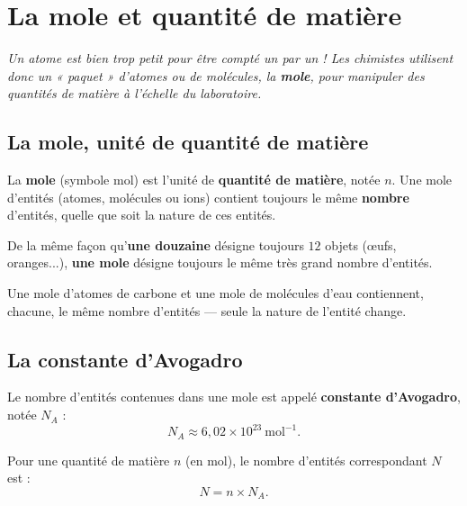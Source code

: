 \chapter{La mole et quantité de matière}

\noindent\textit{Un atome est bien trop petit pour être compté un par un ! Les chimistes
utilisent donc un « paquet » d'atomes ou de molécules, la \textbf{mole}, pour manipuler
des quantités de matière à l'échelle du laboratoire.}
\vspace{8pt}

\connecteBanner

\section{La mole, unité de quantité de matière}

\begin{definition}[Mole]
La \textbf{mole} (symbole $\mathrm{mol}$) est l'unité de \textbf{quantité de matière},
notée $n$. Une mole d'entités (atomes, molécules ou ions) contient toujours le même
\textbf{nombre} d'entités, quelle que soit la nature de ces entités.
\end{definition}

\begin{propriete}[Analogie]
De la même façon qu'\textbf{une douzaine} désigne toujours $12$ objets (œufs, oranges...),
\textbf{une mole} désigne toujours le même très grand nombre d'entités.
\end{propriete}

\begin{exemple}
Une mole d'atomes de carbone et une mole de molécules d'eau contiennent, chacune, le même
nombre d'entités — seule la nature de l'entité change.
\end{exemple}

\section{La constante d'Avogadro}

\begin{definition}
Le nombre d'entités contenues dans une mole est appelé \textbf{constante d'Avogadro},
notée $N_A$ :
\[
N_A\approx6{,}02\times10^{23}\ \text{mol}^{-1}.
\]
\end{definition}

\begin{propriete}
Pour une quantité de matière $n$ (en mol), le nombre d'entités correspondant $N$ est :
\[
N=n\times N_A.
\]
\end{propriete}

